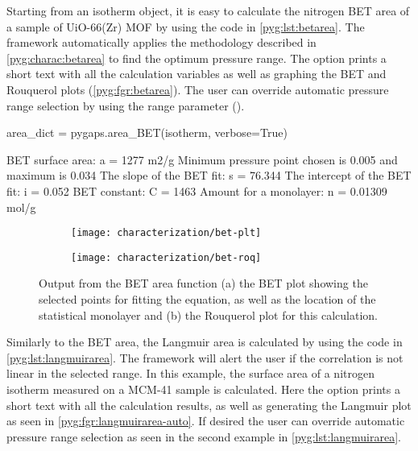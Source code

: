 Starting from an isotherm object, it is easy to
calculate the nitrogen BET area of a sample of UiO-66(Zr) MOF
by using the code in \autoref{pyg:lst:betarea}.
The framework automatically applies the methodology described in
\autoref{pyg:charac:betarea} to find the optimum pressure range. 
The  option prints a short
text with all the calculation variables as well as graphing the
BET and Rouquerol plots (\autoref{pyg:fgr:betarea}).
The user can override automatic pressure range selection by using the
range parameter ().

\begin{samepage}
	\begin{python}[caption={Calculating a BET area},label={pyg:lst:betarea}]
area_dict = pygaps.area_BET(isotherm, verbose=True)
\end{python}
	\begin{pythonout}
BET surface area: a = 1277 m2/g
Minimum pressure point chosen is 0.005 and maximum is 0.034
The slope of the BET fit: 		s = 76.344
The intercept of the BET fit: 	i = 0.052
BET constant: 					C = 1463
Amount for a monolayer: 		n = 0.01309 mol/g
\end{pythonout}
\end{samepage}

\begin{figure}[!htb]
	\centering

	\begin{subfigure}{0.45\linewidth}
		\parbox[c]{0.1\linewidth}{\caption{}%
			\label{pyg:fgr:betarea-plt}}
		\parbox[b]{0.85\linewidth}{%
			\texttt{[image: characterization/bet-plt]}}
	\end{subfigure}%
	\begin{subfigure}{0.45\linewidth}
		\parbox[c]{0.1\linewidth}{\caption{}%
			\label{pyg:fgr:betarea-roq}}
		\parbox[b]{0.85\linewidth}{%
			\texttt{[image: characterization/bet-roq]}}
	\end{subfigure}%

	\caption{Output from the BET area function (a) the BET plot showing
		the selected points for fitting the equation, as well as the location
		of the statistical monolayer and (b) the Rouquerol plot for this
		calculation.}%
	\label{pyg:fgr:betarea}

\end{figure}

Similarly to the BET area, the Langmuir area is calculated by using
the code in \autoref{pyg:lst:langmuirarea}. The framework will alert
the user if the correlation is not linear in the selected range.
In this example, the surface area of a nitrogen isotherm measured 
on a MCM-41 sample is calculated.
Here the  option prints a short
text with all the calculation results, as well as generating the
Langmuir plot as seen in \autoref{pyg:fgr:langmuirarea-auto}.
If desired the user can override automatic pressure range selection
as seen in the second example in \autoref{pyg:lst:langmuirarea}.

